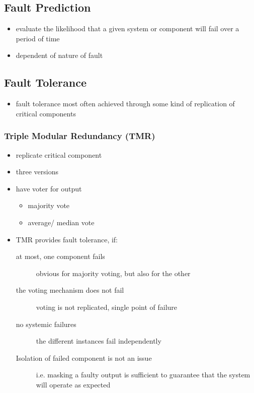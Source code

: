 \documentclass[a4paper, 10pt]{article}
\begin{document}
\subsection*{Fault Prediction}
\begin{itemize}
    \item evaluate the likelihood that a given system or component will fail over a period of time
    \item dependent of nature of fault
\end{itemize}

\subsection*{Fault Tolerance}
\begin{itemize}
    \item fault tolerance most often achieved through some kind of replication of critical components
\end{itemize}

\subsubsection*{Triple Modular Redundancy (TMR)}
\begin{itemize}
    \item replicate critical component
    \item three versions
    \item have voter for output
    \begin{itemize}
        \item majority vote
        \item average/ median vote
    \end{itemize}
    \item TMR provides fault tolerance, if:
    \begin{description}
        \item[at most, one component fails] obvious for majority voting, but also for the other
        \item[the voting mechanism does not fail] voting is not replicated, single point of failure
        \item[no systemic failures] the different instances fail independently
        \item[Isolation of failed component is not an issue] i.e. masking a faulty output is sufficient to guarantee that the system will operate as expected
    \end{description}
\end{itemize}
\end{document}
